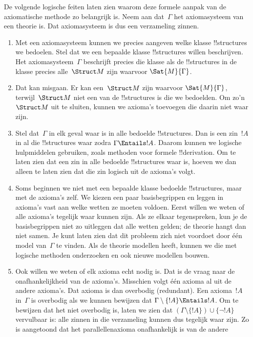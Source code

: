 \documentclass[openany]{memoir}
\begin{document}
\begin{explain}
De volgende logische feiten laten zien waarom deze formele aanpak van
de axiomatische methode zo belangrijk is. Neem aan dat~$\Gamma$ het
axiomasysteem van een theorie is. Dat axiomasysteem is dus een
verzameling zinnen.
\begin{enumerate}
\item Met een axiomasysteem kunnen we precies aangeven welke klasse
  !!{structure}s we bedoelen. Stel dat we een bepaalde klasse
  !!{structure}s willen beschrijven. Het axiomasysteem~$\Gamma$
  beschrijft precies die klasse als de !!{structure}s in de klasse
  precies alle~$\Struct M$ zijn waarvoor $\Sat{M}{\Gamma}$.
\item Dat kan misgaan. Er kan een~$\Struct M$ zijn waarvoor
  $\Sat{M}{\Gamma}$, terwijl~$\Struct M$ niet een van de
  !!{structure}s is die we bedoelden. Om zo'n~$\Struct M$ uit te
  sluiten, kunnen we axioma's toevoegen die daarin niet waar zijn.
\item Stel dat~$\Gamma$ in elk geval waar is in alle bedoelde
  !!{structure}s. Dan is een zin~$!A$ in al die !!{structure}s waar
  zodra $\Gamma \Entails !A$. Daarom kunnen we logische hulpmiddelen
  gebruiken, zoals methoden voor formele !!{derivation}. Om te laten
  zien dat een zin in alle bedoelde !!{structure}s waar is, hoeven we
  dan alleen te laten zien dat die zin logisch uit de axioma's volgt.
\item Soms beginnen we niet met een bepaalde klasse bedoelde
  !!{structure}s, maar met de axioma's zelf. We kiezen een paar
  basisbegrippen en leggen in axioma's vast aan welke wetten ze moeten
  voldoen. Eerst willen we weten of alle axioma's tegelijk waar kunnen
  zijn. Als ze elkaar tegenspreken, kun je de basisbegrippen niet zo
  uitleggen dat alle wetten gelden; de theorie hangt dan niet samen.
  Je kunt laten zien dat dit probleem zich niet voordoet door één model
  van~$\Gamma$ te vinden. Als de theorie modellen heeft, kunnen we die
  met logische methoden onderzoeken en ook nieuwe modellen bouwen.
\item Ook willen we weten of elk axioma echt nodig is. Dat is de vraag
  naar de onafhankelijkheid van de axioma's. Misschien volgt één
  axioma al uit de andere axioma's. Dat axioma is dan overbodig
  (redundant). Een axioma~$!A$ in~$\Gamma$ is overbodig als we kunnen
  bewijzen dat $\Gamma \setminus \{!A\} \Entails !A$. Om te bewijzen
  dat het niet overbodig is, laten we zien dat
  $(\Gamma \setminus \{!A\}) \cup \{\lnot !A\}$ vervulbaar is: alle
  zinnen in die verzameling kunnen dus tegelijk waar zijn. Zo is
  aangetoond dat het parallellenaxioma onafhankelijk is van de andere

\end{enumerate}
\end{explain}
\end{document}
